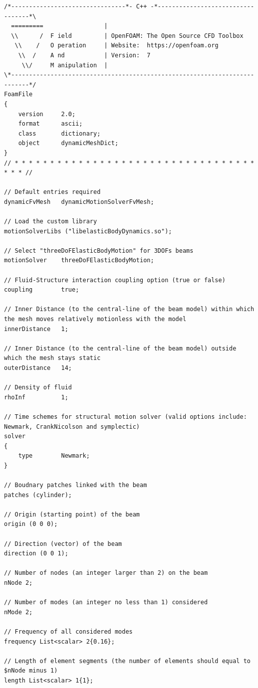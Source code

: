 \begin{lstlisting}
/*--------------------------------*- C++ -*----------------------------------*\
  =========                 |
  \\      /  F ield         | OpenFOAM: The Open Source CFD Toolbox
   \\    /   O peration     | Website:  https://openfoam.org
    \\  /    A nd           | Version:  7
     \\/     M anipulation  |
\*---------------------------------------------------------------------------*/
FoamFile
{
    version     2.0;
    format      ascii;
    class       dictionary;
    object      dynamicMeshDict;
}
// * * * * * * * * * * * * * * * * * * * * * * * * * * * * * * * * * * * * * //

// Default entries required
dynamicFvMesh   dynamicMotionSolverFvMesh;

// Load the custom library
motionSolverLibs ("libelasticBodyDynamics.so");

// Select "threeDoFElasticBodyMotion" for 3DOFs beams
motionSolver    threeDoFElasticBodyMotion;

// Fluid-Structure interaction coupling option (true or false)
coupling        true;

// Inner Distance (to the central-line of the beam model) within which the mesh moves relatively motionless with the model
innerDistance   1;

// Inner Distance (to the central-line of the beam model) outside which the mesh stays static
outerDistance   14;

// Density of fluid
rhoInf          1;

// Time schemes for structural motion solver (valid options include: Newmark, CrankNicolson and symplectic)
solver
{
    type        Newmark;
}

// Boudnary patches linked with the beam
patches (cylinder);

// Origin (starting point) of the beam
origin (0 0 0);

// Direction (vector) of the beam
direction (0 0 1);

// Number of nodes (an integer larger than 2) on the beam
nNode 2;

// Number of modes (an integer no less than 1) considered
nMode 2;

// Frequency of all considered modes
frequency List<scalar> 2{0.16};

// Length of element segments (the number of elements should equal to $nNode minus 1)
length List<scalar> 1{1};


\end{lstlisting}
